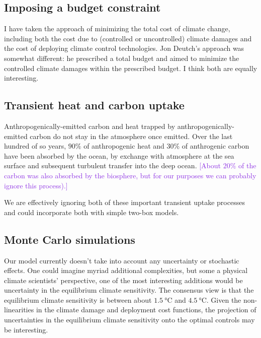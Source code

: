 \documentclass{article}
\begin{document}
\subsection{Imposing a budget constraint}

I have taken the approach of minimizing the total cost of climate change, including both the cost due to (controlled or uncontrolled) climate damages and the cost of deploying climate control technologies. Jon Deutch's approach was somewhat different: he prescribed a total budget and aimed to minimize the controlled climate damages within the prescribed budget. I think both are equally interesting.

\subsection{Transient heat and carbon uptake}
Anthropogenically-emitted carbon and heat trapped by anthropogenically-emitted carbon do not stay in the atmosphere once emitted. Over the last hundred of so years, $90\%$ of anthropogenic heat and $30\%$ of anthrogenic carbon have been absorbed by the ocean, by exchange with atmosphere at the sea surface and subsequent turbulent transfer into the deep ocean. \textcolor{BlueViolet}{[About $20\%$ of the carbon was also absorbed by the biosphere, but for our purposes we can probably ignore this process).]}

We are effectively ignoring both of these important transient uptake processes and could incorporate both with simple two-box models.

\subsection{Monte Carlo simulations}

Our model currently doesn't take into account any uncertainty or stochastic effects. One could imagine myriad additional complexities, but some a physical climate scientists' perspective, one of the most interesting additions would be uncertainty in the equilibrium climate sensitivity. The consensus view is that the equilibrium climate sensitivity is between about $\SI{1.5}{\celsius}$ and $\SI{4.5}{\celsius}$. Given the non-linearities in the climate damage and deployment cost functions, the projection of uncertainties in the equilibrium climate sensitivity onto the optimal controls may be interesting.

%
%
\end{document}
